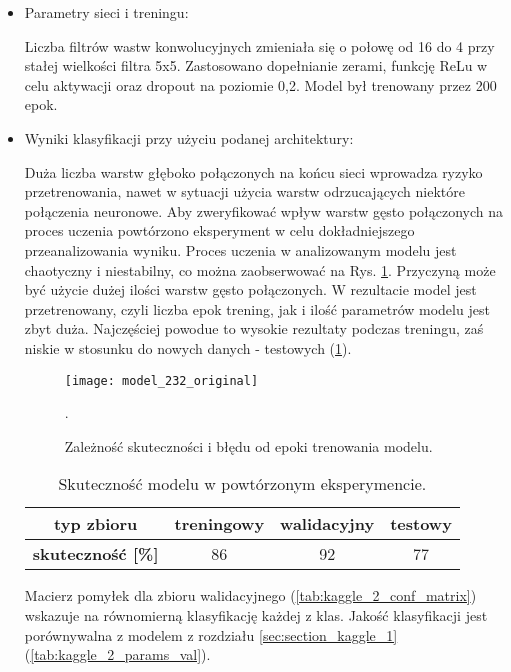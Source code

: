 {\begin{itemize}
\item Parametry sieci i treningu:

Liczba filtrów wastw konwolucyjnych zmieniała się o połowę od 16 do 4 przy stałej wielkości filtra 5x5. Zastosowano dopełnianie zerami, funkcję ReLu w celu aktywacji oraz dropout na poziomie 0,2. Model był trenowany przez 200 epok.

\item Wyniki klasyfikacji przy użyciu podanej architektury:

Duża liczba warstw głęboko połączonych na końcu sieci wprowadza ryzyko przetrenowania, nawet w sytuacji użycia warstw odrzucających niektóre połączenia neuronowe. Aby zweryfikować wpływ warstw gęsto połączonych na proces uczenia powtórzono eksperyment w celu dokładniejszego przeanalizowania wyniku. Proces uczenia w analizowanym modelu jest chaotyczny i niestabilny, co można zaobserwować na Rys. \ref{fig:kaggle_2_acc_trening}. Przyczyną może być użycie dużej ilości warstw gęsto połączonych. W rezultacie model jest przetrenowany, czyli liczba epok trening, jak i ilość parametrów modelu jest zbyt duża. Najczęściej powodue to wysokie rezultaty podczas treningu, zaś niskie w stosunku do nowych danych - testowych (\ref{tab:kaggle_2_acc_2}).

\begin{figure}[h!]
	\centering
	\centering
		\texttt{[image: model\_232\_original]}
	\caption{Zależność skuteczności i błędu od epoki trenowania modelu.}.
	\label{fig:kaggle_2_acc_trening}
\end{figure}

\begin{table}[h!]
\centering
\caption[Short Heading]{Skuteczność modelu w powtórzonym eksperymencie.}
\label{tab:kaggle_2_acc_2}
\begin{tabular}{|c|c|c|c|}
\hline
\textbf{typ zbioru}           & \textbf{treningowy} & \textbf{walidacyjny} & \textbf{testowy} \\ \hline
\textbf{skuteczność {[}\%{]}} & 86                  & 92                   & 77               \\ \hline
\end{tabular}
\end{table}

Macierz pomyłek dla zbioru walidacyjnego (\ref{tab:kaggle_2_conf_matrix}) wskazuje na równomierną klasyfikację każdej z klas. Jakość klasyfikacji jest porównywalna z modelem z rozdziału \ref{sec:section_kaggle_1} (\ref{tab:kaggle_2_params_val}).


\end{itemize}}
